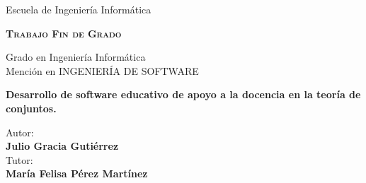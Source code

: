 \documentclass[openright,twoside,10pt]{book}
\begin{document}
{\begin{titlepage}
\begin{center}
            \vspace*{0.15in}
            \vspace*{0.6in}
            \begin{Huge}
                {Escuela de Ingeniería Informática\\}
            \end{Huge}
            \vspace*{0.2in}
            \begin{Large}
                \textbf{\textsc{Trabajo Fin de Grado\\}}
            \end{Large}
            \vspace*{0.5in}
            \begin{Large}
                { Grado en Ingeniería Informática}\\
                { Mención en INGENIERÍA DE SOFTWARE \\}
            \end{Large}
            \vspace*{0.5in}
            \vspace*{0.3in}
            \begin{large}
                \textbf{{\LARGE Desarrollo de software educativo de apoyo a la docencia en la teoría de
conjuntos.\\}}
            \end{large}
            \vspace*{0.3in}
            \vspace*{1.3in}
            \begin{large}
                \begin{flushright}
                    Autor:\\
                    \textbf{Julio Gracia Gutiérrez} \\
                    \vspace*{0.3in}
                    Tutor:\\
                    \textbf{María Felisa Pérez Martínez}
                \end{flushright}
            \end{large}
        \end{center}
    \end{titlepage}

    }
    
\end{document}
